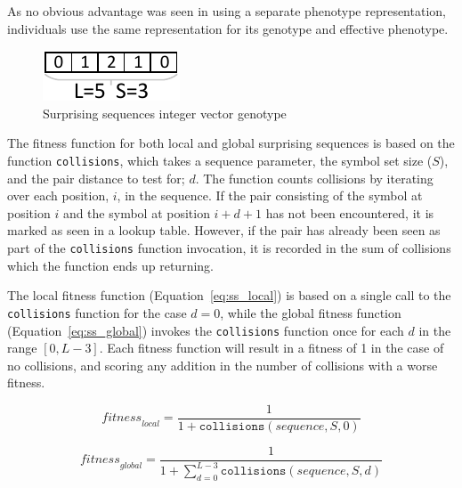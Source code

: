 \documentclass[paper=a4, fontsize=10pt]{scrartcl} %
\begin{document}
As no obvious advantage was seen in using a separate phenotype representation, individuals use the same representation for its genotype and effective phenotype.
\setlength\parindent{0pt}

\begin{figure}[H]
\centering
\includegraphics[scale=1.0]{images/surprising_genotype}
\caption{Surprising sequences integer vector genotype}
\label{fig:surprising_genotype}
\end{figure}

\setlength\parindent{17pt}
The fitness function for both local and global surprising sequences is based on the function \texttt{collisions}, which takes a sequence parameter, the symbol set size ($S$), and the pair distance to test for; $d$. The function counts collisions by iterating over each position, $i$, in the sequence. If the pair consisting of the symbol at position $i$ and the symbol at position $i+d+1$ has not been encountered, it is marked as seen in a lookup table. However, if the pair has already been seen as part of the \texttt{collisions} function invocation, it is recorded in the sum of collisions which the function ends up returning.

The local fitness function (Equation~\ref{eq:ss_local}) is based on a single call to the \texttt{collisions} function for the case $d=0$, while the global fitness function (Equation~\ref{eq:ss_global}) invokes the \texttt{collisions} function once for each $d$ in the range $[0, L-3]$. Each fitness function will result in a fitness of 1 in the case of no collisions, and scoring any addition in the number of collisions with a worse fitness.
\setlength\parindent{0pt}

\begin{equation}
\label{eq:ss_local}
\textit{fitness}_\textit{local} = \frac{1}{1 + \texttt{collisions}(\textit{sequence}, S, 0)}
\end{equation}

\begin{equation}
\label{eq:ss_global}
\textit{fitness}_\textit{global} = \frac{1}{1 + \sum_{d=0}^{L - 3} \texttt{collisions}(\textit{sequence}, S, d)}
\end{equation}
\end{document}
